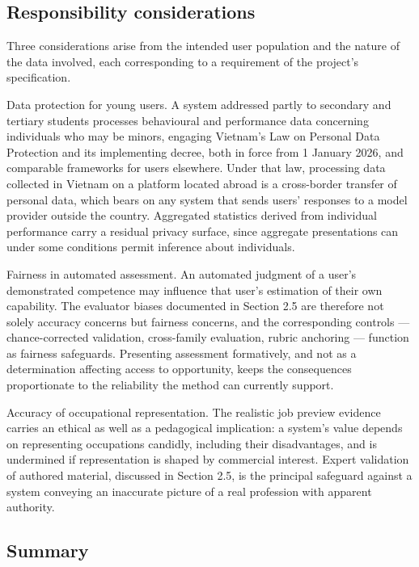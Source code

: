 \subsection{Responsibility considerations}

Three considerations arise from the intended user population and the nature of the data involved, each corresponding to a requirement of the project's specification.

Data protection for young users. A system addressed partly to secondary and tertiary students processes behavioural and performance data concerning individuals who may be minors, engaging Vietnam's Law on Personal Data Protection\cite{r99} and its implementing decree\cite{r100}, both in force from 1 January 2026, and comparable frameworks for users elsewhere. Under that law, processing data collected in Vietnam on a platform located abroad is a cross-border transfer of personal data, which bears on any system that sends users' responses to a model provider outside the country. Aggregated statistics derived from individual performance carry a residual privacy surface, since aggregate presentations can under some conditions permit inference about individuals.

Fairness in automated assessment. An automated judgment of a user's demonstrated competence may influence that user's estimation of their own capability. The evaluator biases documented in Section 2.5 are therefore not solely accuracy concerns but fairness concerns, and the corresponding controls --- chance-corrected validation, cross-family evaluation, rubric anchoring --- function as fairness safeguards. Presenting assessment formatively, and not as a determination affecting access to opportunity, keeps the consequences proportionate to the reliability the method can currently support.

Accuracy of occupational representation. The realistic job preview evidence carries an ethical as well as a pedagogical implication: a system's value depends on representing occupations candidly, including their disadvantages, and is undermined if representation is shaped by commercial interest. Expert validation of authored material, discussed in Section 2.5, is the principal safeguard against a system conveying an inaccurate picture of a real profession with apparent authority.

\subsection{Summary}

